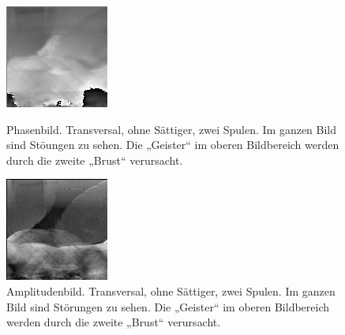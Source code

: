 \documentclass[
    11pt,
    ngerman
]{scrbook}
\begin{document}
\begin{figure}[htbp]
    \begin{minipage}[htbp]{.45\textwidth}
        \centering
        \includegraphics[width=.9\textwidth]{Abbildungen/2015-03-13_3_1.png}
        \caption{Phasenbild. Transversal, ohne Sättiger, zwei Spulen. Im ganzen Bild sind Stöungen zu sehen. Die „Geister“ im oberen Bildbereich werden durch die zweite „Brust“ verursacht.}
        \label{fig:2015-03-13_3_1}
    \end{minipage}
    \hfill
    \begin{minipage}[htbp]{.45\textwidth}
        \centering
        \includegraphics[width=.9\textwidth]{Abbildungen/2015-03-13_2_1.png}
        \caption{Amplitudenbild. Transversal, ohne Sättiger, zwei Spulen. Im ganzen Bild sind Störungen zu sehen. Die „Geister“ im oberen Bildbereich werden durch die zweite „Brust“ verursacht.}
        \label{fig:2015-03-13_2_1}
    \end{minipage}
\end{figure}
\end{document}
